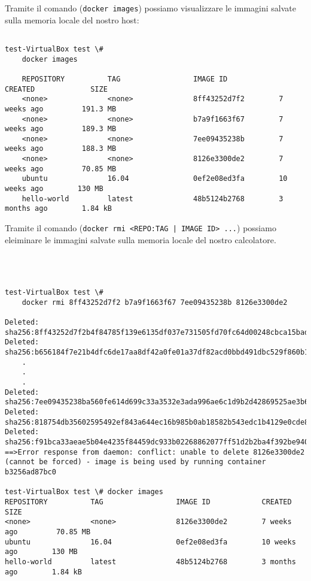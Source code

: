Tramite il comando (\texttt{docker images}) possiamo visualizzare le immagini salvate sulla memoria locale del nostro host:
\begin{verbatim}

test-VirtualBox test \#
	docker images
	 
	REPOSITORY          TAG                 IMAGE ID            CREATED             SIZE
	<none>              <none>              8ff43252d7f2        7 weeks ago         191.3 MB
	<none>              <none>              b7a9f1663f67        7 weeks ago         189.3 MB
	<none>              <none>              7ee09435238b        7 weeks ago         188.3 MB
	<none>              <none>              8126e3300de2        7 weeks ago         70.85 MB
	ubuntu              16.04               0ef2e08ed3fa        10 weeks ago        130 MB
	hello-world         latest              48b5124b2768        3 months ago        1.84 kB

\end{verbatim}
Tramite il comando (\texttt{docker rmi <REPO:TAG | IMAGE ID> ...}) possiamo eleiminare le immagini salvate sulla memoria locale del nostro calcolatore.\\\\\\
\begin{verbatim}

test-VirtualBox test \# 
	docker rmi 8ff43252d7f2 b7a9f1663f67 7ee09435238b 8126e3300de2

Deleted: sha256:8ff43252d7f2b4f84785f139e6135df037e731505fd70fc64d00248cbca15bad
Deleted: sha256:b656184f7e21b4dfc6de17aa8df42a0fe01a37df82acd0bbd491dbc529f860b1
	.
	.
	.
Deleted: sha256:7ee09435238ba560fe614d699c33a3532e3ada996ae6c1d9b2d42869525ae3b6
Deleted: sha256:818754db35602595492ef843a644ec16b985b0ab18582b543edc1b4129e0cde8
Deleted: sha256:f91bca33aeae5b04e4235f84459dc933b02268862077ff51d2b2ba4f392be940
==>Error response from daemon: conflict: unable to delete 8126e3300de2 (cannot be forced) - image is being used by running container b3256ad87bc0

test-VirtualBox test \# docker images 
REPOSITORY          TAG                 IMAGE ID            CREATED             SIZE
<none>              <none>              8126e3300de2        7 weeks ago         70.85 MB
ubuntu              16.04               0ef2e08ed3fa        10 weeks ago        130 MB
hello-world         latest              48b5124b2768        3 months ago        1.84 kB

\end{verbatim}
